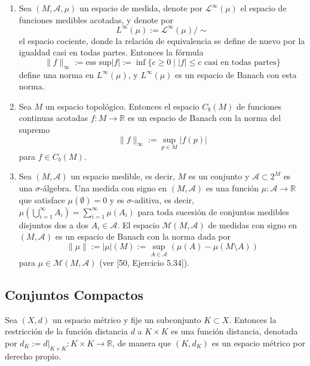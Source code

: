 \begin{example}
\begin{enumerate}
    \item[(iv)] Sea $(M, \mathcal{A}, \mu)$ un espacio de medida, denote por $\mathcal{L}^{\infty}(\mu)$ el espacio de funciones medibles acotadas, y denote por
    \[ L^{\infty}(\mu) := \mathcal{L}^{\infty}(\mu)/{\sim} \]
    el espacio cociente, donde la relación de equivalencia se define de nuevo por la igualdad casi en todas partes. Entonces la fórmula
    \begin{equation}\label{eq:1.3}
    \|f\|_{\infty} := \text{ess sup}|f| := \inf \{c\ge 0 \mid |f|\le c \text{ casi en todas partes}\}
    \end{equation}
    define una norma en $L^{\infty}(\mu)$, y $L^{\infty}(\mu)$ es un espacio de Banach con esta norma.
    
    \item[(v)] Sea $M$ un espacio topológico. Entonces el espacio $C_{b}(M)$ de funciones continuas acotadas $f:M\rightarrow\mathbb{R}$ es un espacio de Banach con la norma del supremo
    \[ \|f\|_{\infty} := \sup_{p\in M}|f(p)| \]
    para $f\in C_{b}(M)$.
    
    \item[(vi)] Sea $(M, \mathcal{A})$ un espacio medible, es decir, $M$ es un conjunto y $\mathcal{A}\subset 2^{M}$ es una $\sigma$-álgebra. Una medida con signo en $(M, \mathcal{A})$ es una función $\mu:\mathcal{A}\rightarrow\mathbb{R}$ que satisface $\mu(\emptyset)=0$ y es $\sigma$-aditiva, es decir, $\mu(\bigcup_{i=1}^{\infty}A_{i})=\sum_{i=1}^{\infty}\mu(A_{i})$ para toda sucesión de conjuntos medibles disjuntos dos a dos $A_{i}\in\mathcal{A}$. El espacio $\mathcal{M}(M,\mathcal{A})$ de medidas con signo en $(M, \mathcal{A})$ es un espacio de Banach con la norma dada por
    \begin{equation}\label{eq:1.4}
    \|\mu\| := |\mu|(M) := \sup_{A\in\mathcal{A}}(\mu(A)-\mu(M\setminus A))
    \end{equation}
    para $\mu\in\mathcal{M}(M,\mathcal{A})$ (ver [50, Ejercicio 5.34]).
\end{enumerate}
\end{example}

\subsection{Conjuntos Compactos}

Sea $(X,d)$ un espacio métrico y fije un subconjunto $K\subset X$. Entonces la restricción de la función distancia $d$ a $K\times K$ es una función distancia, denotada por $d_{K}:=d|_{K\times K}:K\times K\rightarrow\mathbb{R}$, de manera que $(K,d_{K})$ es un espacio métrico por derecho propio.

